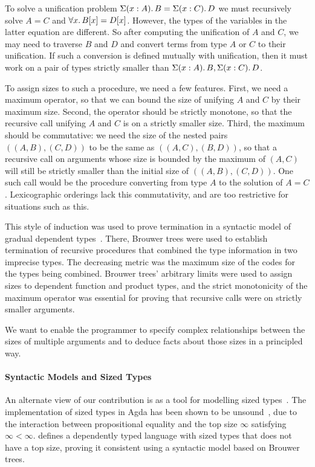 To solve a unification problem $ \Sigma(x : A)\ldotp B = \Sigma(x : C)\ldotp D$
we must recursively
solve $A = C$ and $\forall x \ldotp B[x] = D[x]$.
However, the types of the variables in the latter equation are different.
So after computing the unification of $A$ and $C$, we may need to traverse
$B$ and $D$ and convert terms from type $A$ or $C$ to their unification.
If such a conversion is defined mutually with unification, then
it must work on a pair of types strictly smaller than
$\Sigma(x : A)\ldotp B , \Sigma(x : C)\ldotp D$.

To assign sizes to such a procedure, we need a few features.
First, we need
a maximum operator, so that we can bound the size of unifying $A$ and $C$
by their maximum size.
Second, the operator should be strictly monotone, so that the recursive
call unifying $A$ and $C$ is on a strictly smaller size.
Third, the maximum should be commutative:
we need the size of the nested pairs $((A,B),(C,D))$
to be the same as $((A,C),(B,D))$, so that a recursive call on arguments whose
size is bounded by the maximum of  $(A,C)$ will still
be strictly smaller than the initial size of $((A,B),(C,D))$.
One such call would be the procedure converting from type $A$ to the
solution of $A=C$.
Lexicographic orderings lack this commutativity, and are too restrictive
for situations such as this.

This style of induction was used to prove termination
in a syntactic model of gradual dependent types~\citep{Eremondi_2023}. There, Brouwer trees
were used to establish termination of recursive procedures that
combined the type information in two imprecise types.
The decreasing metric was the maximum size of the codes for the types being combined. Brouwer trees' arbitrary limits were used to assign sizes
to dependent function and product types, and the strict monotonicity of the
maximum operator was essential for proving that recursive calls were on
strictly smaller arguments.

We want to enable the programmer
to specify complex relationships between the sizes of multiple arguments
and to deduce facts about those sizes in a principled way.

\paragraph{Syntactic Models and Sized Types}
%
An alternate view of our contribution is as a tool for modelling sized types~\citep{10.1145/237721.240882}.
The implementation of sized types in Agda has been shown to be unsound~\citep{agdaSizedIssue}, due to the interaction
between propositional equality and the top size $\infty$ satisfying $\infty < \infty$.
 defines a dependently typed language with sized types that does not have a top size, proving it consistent
using a syntactic model based on Brouwer trees.

